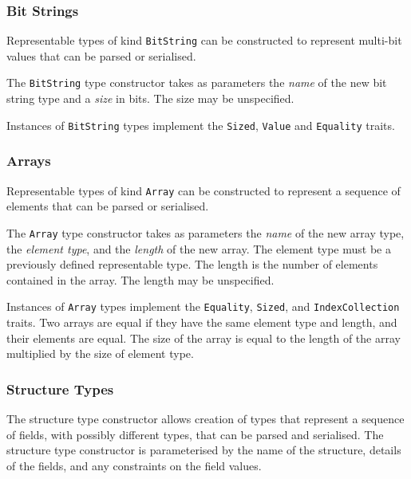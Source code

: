 \documentclass[10pt,twocolumn,a4paper]{article}
\newcommand{\code}[1]{\texttt{#1}}
\begin{document}
\subsubsection{Bit Strings}
\label{sec:bit-string}

Representable types of kind \code{BitString} can be constructed to
represent multi-bit values that can be parsed or serialised.

The \code{BitString} type constructor takes as parameters the \emph{name}
of the new bit string type and a \emph{size} in bits. The size may be
unspecified. 

Instances of \code{BitString} types implement the \code{Sized}, \code{Value}
and \code{Equality} traits. 

\subsubsection{Arrays}

Representable types of kind \code{Array} can be constructed to represent
a sequence of elements that can be parsed or serialised.

The \code{Array} type constructor takes as parameters the \emph{name} of
the new array type, the \emph{element type}, and the \emph{length} of the
new array.
The element type must be a previously defined representable type.
The length is the number of elements contained in the array.
The length may be unspecified. 

Instances of \code{Array} types implement the \code{Equality}, \code{Sized},
and \code{IndexCollection} traits.
Two arrays are equal if they have the same element type and length, and
their elements are equal.
The size of the array is equal to the length of the array multiplied by the
size of element type.

\subsubsection{Structure Types}

The structure type constructor allows creation of types that represent a
sequence of fields, with possibly different types, that can be parsed and
serialised. The structure type constructor is parameterised by the name of
the structure, details of the fields, and any constraints on the field
values.
\end{document}
